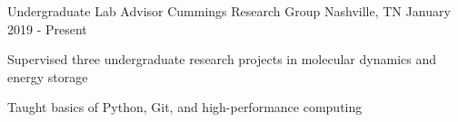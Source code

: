 
\begin{cventries}
  \cventry
    {Undergraduate Lab Advisor} %
    {Cummings Research Group} %
    {Nashville, TN} %
    {January 2019 - Present} %
    {
      \begin{cvitems} %
        \item {Supervised three undergraduate research 
            projects in molecular dynamics and energy storage}
        \item {Taught basics of Python, Git, 
            and high-performance computing}
      \end{cvitems}
    }
\end{cventries}
